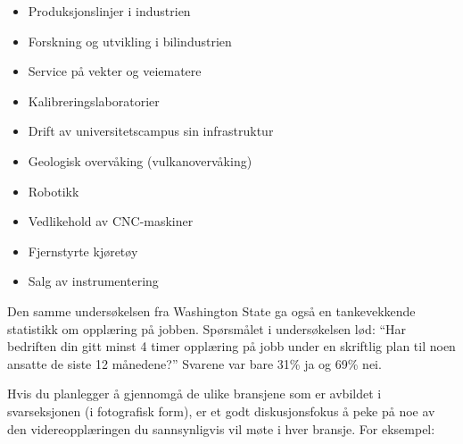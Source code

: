 \begin{itemize}
\item{} Produksjonslinjer i industrien
\item{} Forskning og utvikling i bilindustrien
\item{} Service på vekter og veiematere
\item{} Kalibreringslaboratorier
\item{} Drift av universitetscampus sin infrastruktur
\item{} Geologisk overvåking (vulkanovervåking)
\item{} Robotikk
\item{} Vedlikehold av CNC-maskiner
\item{} Fjernstyrte kjøretøy
\item{} Salg av instrumentering
\end{itemize}







Den samme undersøkelsen fra Washington State ga også en tankevekkende statistikk om opplæring på jobben.  Spørsmålet i undersøkelsen lød: ``Har bedriften din gitt minst 4 timer opplæring på jobb under en skriftlig plan til noen ansatte de siste 12 månedene?''  Svarene var bare 31\% ja og 69\% nei.

\vskip 10pt

Hvis du planlegger å gjennomgå de ulike bransjene som er avbildet i svarseksjonen (i fotografisk form), er et godt diskusjonsfokus å peke på noe av den videreopplæringen du sannsynligvis vil møte i hver bransje.  For eksempel:

